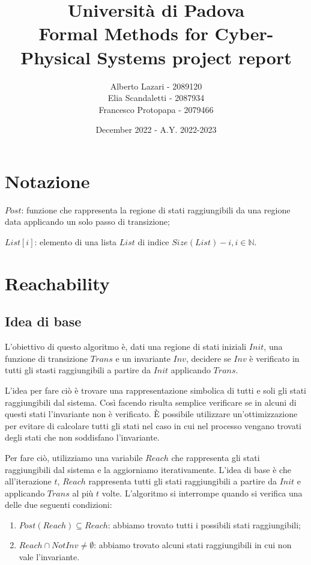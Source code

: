 \documentclass[12pt]{article}
\title{\textbf{Università di Padova \\ Formal Methods for Cyber-Physical Systems project report}}
\author{Alberto Lazari - 2089120 \\ Elia Scandaletti - 2087934 \\ Francesco Protopapa - 2079466 \\}
\date{December 2022 - A.Y. 2022-2023}
\begin{document}
    \maketitle
    \pagebreak

    \tableofcontents
    \pagebreak

    \section{Notazione}
    \begin{description}
        \item $Post$: funzione che rappresenta la regione di stati raggiungibili da una regione data applicando un solo passo di transizione;
        \item $List[i]$: elemento di una lista $List$ di indice $Size(List) - i, i \in \mathbb N$.
    \end{description}

    \section{Reachability}
    \subsection{Idea di base}
    L'obiettivo di questo algoritmo è, dati una regione di stati iniziali $Init$, una funzione di transizione $Trans$ e un invariante $Inv$, decidere se $Inv$ è verificato in tutti gli stasti raggiungibili a partire da $Init$ applicando $Trans$.

    L'idea per fare ciò è trovare una rappresentazione simbolica di tutti e soli gli stati raggiungibili dal sistema.
    Così facendo risulta semplice verificare se in alcuni di questi stati l'invariante non è verificato.
    È possibile utilizzare un'ottimizzazione per evitare di calcolare tutti gli stati nel caso in cui nel processo vengano trovati degli stati che non soddisfano l'invariante.

    Per fare ciò, utilizziamo una variabile $Reach$ che rappresenta gli stati raggiungibili dal sistema e la aggiorniamo iterativamente.
    L'idea di base è che all'iterazione $t$, $Reach$ rappresenta tutti gli stati raggiungibili a partire da $Init$ e applicando $Trans$ al più $t$ volte.
    L'algoritmo si interrompe quando si verifica una delle due seguenti condizioni:
    \begin{enumerate}
        \item $Post(Reach) \subseteq Reach $: abbiamo trovato tutti i possibili stati raggiungibili;
        \item $Reach \cap NotInv \neq \emptyset$: abbiamo trovato alcuni stati raggiungibili in cui non vale l'invariante.
    \end{enumerate}
\end{document}
